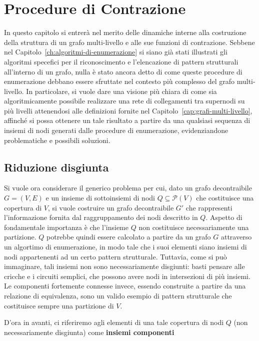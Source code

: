 \chapter{Procedure di Contrazione}\label{cap:proc_contr}

In questo capitolo si entrerà nel merito delle dinamiche interne alla costruzione della struttura di un grafo
multi-livello e alle sue funzioni di contrazione.
Sebbene nel Capitolo~\ref{ch:algoritmi-di-enumerazione} si siano già stati illustrati gli
algoritmi specefici per il riconoscimento e l'elencazione di pattern strutturali all'interno di un grafo,
nulla è stato ancora detto di come queste procedure di enumerazione debbano essere sfruttate nel contesto più
complesso del grafo multi-livello.
In particolare, si vuole dare una visione più chiara di come sia algoritmicamente
possibile realizzare una rete di collegamenti tra supernodi su più livelli attenendosi alle definizioni
fornite nel Capitolo~\ref{cap:grafi-multi-livello}, affinché si possa ottenere un tale risultato a partire da una
qualsiasi sequenza di insiemi di nodi generati dalle procedure di enumerazione, evidenziandone problematiche e
possibili soluzioni.

\section{Riduzione disgiunta}

Si vuole ora considerare il generico problema per cui, dato un grafo decontraibile $G = (V, E)$ e un insieme di
sottoinsiemi di nodi $Q \subseteq \mathcal{P}(V)$ che costituisce una copertura di $V$, si vuole costruire un grafo
decontraibile $G'$ che rappresenti l'informazione fornita dal raggruppamento dei nodi descritto in $Q$.
Aspetto di fondamentale importanza è che l'insieme $Q$ non costituisce necessariamente una partizione.
$Q$ potrebbe quindi essere calcolato a partire da un grafo $G$ attraverso un algortimo di enumerazione, in modo tale
che i suoi elementi siano insiemi di nodi appartenenti ad un certo pattern strutturale.
Tuttavia, come si può immaginare, tali insiemi non sono necessariamente disgiunti: basti pensare alle cricche e i
circuiti semplici, che possono avere nodi in intersezioni di più insiemi.
Le componenti fortemente connesse invece, essendo construite a partire da una relazione di equivalenza, sono un
valido esempio di pattern strutturale che costituisce sempre una partizione di $V$. \newline

D'ora in avanti, ci riferiremo agli elementi di una tale copertura di nodi $Q$ (non necessariamente disgiunta)
come \textbf{insiemi componenti} \newline

